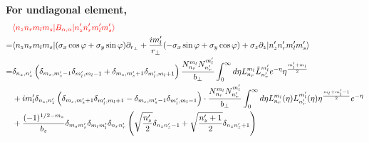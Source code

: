 \textbf{For undiagonal element,}
\begin{equation}
\begin{aligned}
  &\textcolor{red}{\langle n_z n_r m_l m_s | B_{\alpha, \alpha} | n_z^{\prime} n_r^{\prime} m_l^{\prime} m_s^{\prime} \rangle}\\
  =& \langle n_z n_r m_l m_s | (\sigma_x \cos\varphi + \sigma_{y}\sin\varphi)\partial_{r_{\perp}} + \frac{im_l^{\prime}}{r_{\perp}}(-\sigma_x\sin\varphi + \sigma_y\cos\varphi) + \sigma_z\partial_z | n_z^{\prime} n_r^{\prime} m_l^{\prime} m_s^{\prime} \rangle  \\
  =& \delta_{n_z,n_z^{\prime}} \left( \delta_{m_s,m_s^{\prime}-1} \delta_{m_{l}^{\prime},m_{l}-1} + \delta_{m_s,m_s^{\prime}+1} \delta _{m_{l}^{\prime},m_{l}+1} \right) \frac{N_{n_r}^{m_l} N_{n_r^{\prime}}^{m_l^{\prime}}}{b_{\perp}} \int_{0}^{\infty} d\eta L_{n_r}^{m_l}\tilde{L}_{n_r^\prime}^{m_l^\prime} e^{-\eta} \eta^{\frac{m_{l}^{\prime} + m_l}{2}} \\
  &+ i m_l^\prime \delta_{n_z,n_z^\prime} \left(\delta_{m_s,m_s^{\prime}+1} \delta_{m_{l}^{\prime},m_{l}+1} - \delta_{m_s,m_s^{\prime}-1} \delta_{m_{l}^{\prime},m_{l}-1} \right) \cdot \frac{N_{n_r}^{m_l} N_{n_r^{\prime}}^{m_l^{\prime}}}{b_{\perp}} \int_{0}^{\infty} d\eta L_{n_r}^{m_l}(\eta) L_{n_r^\prime}^{m_l^\prime}(\eta) \eta^{\frac{m_l + m_l^\prime - 1}{2}} e^{-\eta}\\
  &+ \frac{(-1)^{1 / 2-m_{s}}}{b_{z}} \delta_{m_{s} m_{s}^{\prime}} \delta_{m_{l} m_{l}^{\prime}} \delta_{n_{r} n_{r}^{\prime}}\left(\sqrt{\frac{n_{z}^{\prime}}{2}} \delta_{n_{z} n_{z}^{\prime}-1}+\sqrt{\frac{n_{z}^{\prime}+1}{2}} \delta_{n_{z} n_{z}^{\prime}+1}\right) \label{oc_undiagonal}
\end{aligned}
\end{equation}
